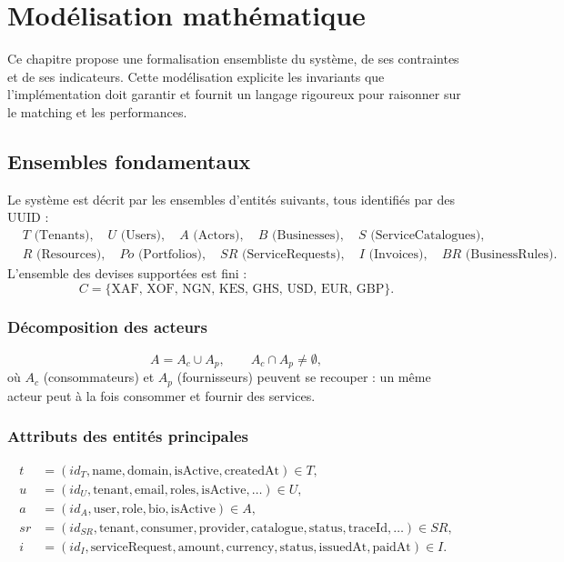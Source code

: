 \chapter{Modélisation mathématique}
\label{chap:math}

Ce chapitre propose une formalisation ensembliste du système, de ses contraintes et de ses
indicateurs. Cette modélisation explicite les invariants que l'implémentation doit garantir
et fournit un langage rigoureux pour raisonner sur le matching et les performances.

\section{Ensembles fondamentaux}

Le système est décrit par les ensembles d'entités suivants, tous identifiés par des UUID :
\[
\begin{aligned}
&T \text{ (Tenants)}, \quad U \text{ (Users)}, \quad A \text{ (Actors)}, \quad
B \text{ (Businesses)}, \quad S \text{ (ServiceCatalogues)}, \\
&R \text{ (Resources)}, \quad Po \text{ (Portfolios)}, \quad SR \text{ (ServiceRequests)},
\quad I \text{ (Invoices)}, \quad BR \text{ (BusinessRules)}.
\end{aligned}
\]
L'ensemble des devises supportées est fini :
\[
C = \{\text{XAF, XOF, NGN, KES, GHS, USD, EUR, GBP}\}.
\]

\subsection{Décomposition des acteurs}
\[
A = A_{c} \cup A_{p}, \qquad A_{c} \cap A_{p} \neq \emptyset,
\]
où $A_c$ (consommateurs) et $A_p$ (fournisseurs) peuvent se recouper : un même acteur peut
à la fois consommer et fournir des services.

\subsection{Attributs des entités principales}
\begin{align*}
t  &= (\mathit{id}_T, \text{name}, \text{domain}, \text{isActive}, \text{createdAt}) \in T,\\
u  &= (\mathit{id}_U, \text{tenant}, \text{email}, \text{roles}, \text{isActive}, \dots) \in U,\\
a  &= (\mathit{id}_A, \text{user}, \text{role}, \text{bio}, \text{isActive}) \in A,\\
sr &= (\mathit{id}_{SR}, \text{tenant}, \text{consumer}, \text{provider}, \text{catalogue},
       \text{status}, \text{traceId}, \dots) \in SR,\\
i  &= (\mathit{id}_I, \text{serviceRequest}, \text{amount}, \text{currency}, \text{status},
       \text{issuedAt}, \text{paidAt}) \in I.
\end{align*}

